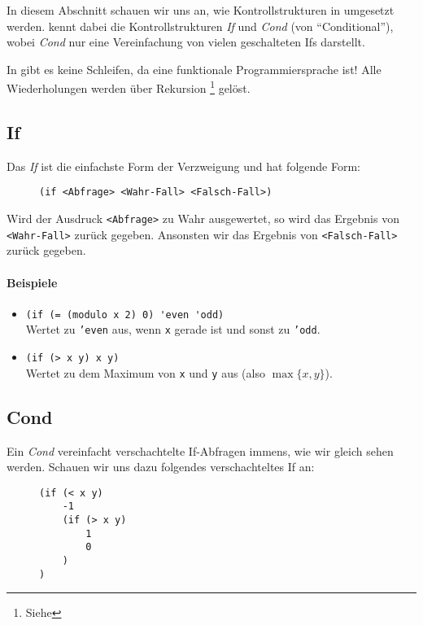 
In diesem Abschnitt schauen wir uns an, wie Kontrollstrukturen in \racketText umgesetzt werden. \racketText kennt dabei die Kontrollstrukturen \textit{If} und \textit{Cond} (von \enquote{Conditional}), wobei \textit{Cond} nur eine Vereinfachung von vielen geschalteten Ifs darstellt.

In \racketText gibt es keine Schleifen, da \racketText eine funktionale Programmiersprache ist! Alle Wiederholungen werden über Rekursion \footnote{Siehe } gelöst.

\subsection{If}
	Das \textit{If} ist die einfachste Form der Verzweigung und hat folgende Form:
	\begin{figure}[H]
		\centering
		\lstinline[language = Racket]|(if <Abfrage> <Wahr-Fall> <Falsch-Fall>)|
	\end{figure}
	Wird der Ausdruck \texttt{<Abfrage>} zu Wahr ausgewertet, so wird das Ergebnis von \texttt{<Wahr-Fall>} zurück gegeben. Ansonsten wir das Ergebnis von \texttt{<Falsch-Fall>} zurück gegeben.
	
	
	\paragraph{Beispiele}
		\begin{itemize}
			\item \lstinline[language = Racket]|(if (= (modulo x 2) 0) 'even 'odd)| \\
				  Wertet zu \texttt{'even} aus, wenn \texttt{x} gerade ist und sonst zu \texttt{'odd}.
			\item \lstinline[language = Racket]|(if (> x y) x y)| \\
				  Wertet zu dem Maximum von \texttt{x} und \texttt{y} aus (also \( \max \{ x, y \} \)).
		\end{itemize}

\subsection{Cond}
	Ein \textit{Cond} vereinfacht verschachtelte If-Abfragen immens, wie wir gleich sehen werden. Schauen wir uns dazu folgendes verschachteltes If an:
	\begin{figure}[H]
		\centering
		\begin{lstlisting}[language = Racket]
(if (< x y)
	-1
	(if (> x y)
		1
		0
	)
)
\end{lstlisting}
	\end{figure}

